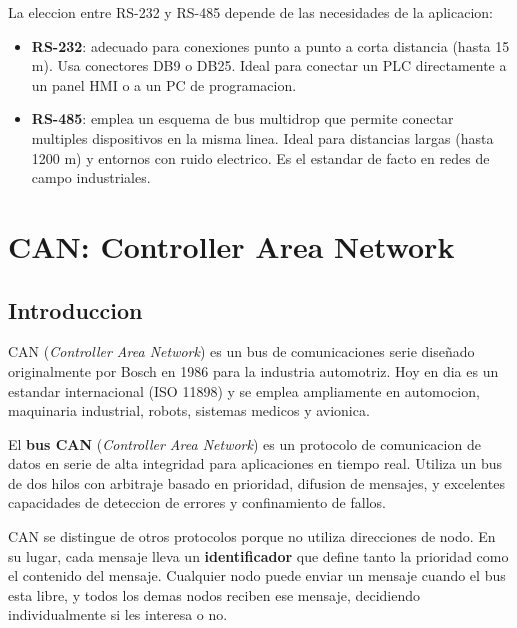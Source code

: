 La eleccion entre RS-232 y RS-485 depende de las necesidades de la aplicacion:

\begin{itemize}
    \item \textbf{RS-232}: adecuado para conexiones punto a punto a corta distancia
    (hasta 15 m). Usa conectores DB9 o DB25. Ideal para conectar un PLC
    directamente a un panel HMI o a un PC de programacion.
    \item \textbf{RS-485}: emplea un esquema de bus multidrop que permite conectar
    multiples dispositivos en la misma linea. Ideal para distancias largas
    (hasta 1200 m) y entornos con ruido electrico. Es el estandar de facto en
    redes de campo industriales.
\end{itemize}


\section{CAN: Controller Area Network}

\subsection{Introduccion}

CAN (\textit{Controller Area Network}) es un bus de comunicaciones serie
diseñado originalmente por Bosch en 1986 para la industria automotriz. Hoy en
dia es un estandar internacional (ISO 11898) y se emplea ampliamente en
automocion, maquinaria industrial, robots, sistemas medicos y avionica.

\begin{definicion}[CAN]
El \textbf{bus CAN} (\textit{Controller Area Network}) es un protocolo de
comunicacion de datos en serie de alta integridad para aplicaciones en tiempo
real. Utiliza un bus de dos hilos con arbitraje basado en prioridad, difusion de
mensajes, y excelentes capacidades de deteccion de errores y confinamiento de
fallos.
\end{definicion}

CAN se distingue de otros protocolos porque no utiliza direcciones de nodo.
En su lugar, cada mensaje lleva un \textbf{identificador} que define tanto la
prioridad como el contenido del mensaje. Cualquier nodo puede enviar un
mensaje cuando el bus esta libre, y todos los demas nodos reciben ese mensaje,
decidiendo individualmente si les interesa o no.

